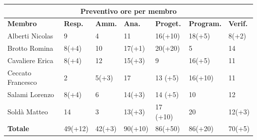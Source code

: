 \documentclass[a4paper, 12pt]{article}
\begin{document}
\begin{center}
	\begin{tabularx}{\textwidth}{|X|X|X|X|X|X|X|}
		\hline
		\multicolumn{7}{|c|}{\textbf{Preventivo ore per membro}}                                              \\
		\hline
		\hline
		\textbf{Membro}   & \textbf{Resp.}    & \textbf{Amm.}   & \textbf{Ana.} &
		\textbf{Proget.}  & \textbf{Program.} & \textbf{Verif.}                                               \\
		\hline
		Alberti Nicolas   & 9                 & 4               & 11            & 16(+10)  & 18(+5)  & 8(+2)  \\
		\hline
		Brotto Romina     & 8(+4)             & 10              & 17(+1)        & 20(+20)  & 5       & 14     \\
		\hline
		Cavaliere Erica   & 8(+4)             & 12              & 15(+3)        & 9        & 16(+5)  & 11     \\
		\hline
		Ceccato Francesco & 2                 & 5(+3)           & 17            & 13 (+5)  & 16(+10) & 11     \\
		\hline
		Salami Lorenzo    & 8(+4)             & 6               & 14(+3)        & 14 (+5)  & 10      & 12     \\
		\hline
		Soldà Matteo      & 14                & 3               & 13(+3)        & 17 (+10) & 20      & 12(+3) \\
		\hline
		\hline
		\textbf{Totale}   & 49(+12)           & 42(+3)          & 90(+10)       & 86(+50)  & 86(+20) & 70(+5) \\
		\hline
	\end{tabularx}\\[8pt]
	\mbox{}\\
\end{center}

\newpage
\end{document}
